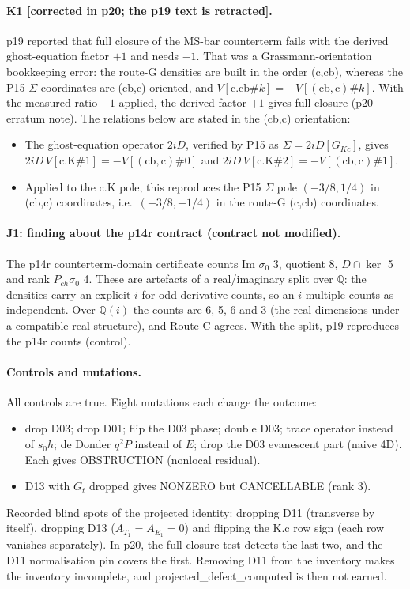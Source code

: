 \paragraph{K1 [corrected in p20; the p19 text is retracted].} p19 reported that full closure of the MS-bar
counterterm fails with the derived ghost-equation factor $+1$ and needs $-1$. That was a Grassmann-orientation
bookkeeping error: the route-G densities are built in the order (c,cb), whereas the P15 $\Sigma$ coordinates are
(cb,c)-oriented, and $V[\mathrm{c.cb}\#k]=-V[(\mathrm{cb,c})\#k]$. With the measured ratio $-1$ applied, the derived
factor $+1$ gives full closure (p20 erratum note). The relations below are stated in the (cb,c) orientation:
\begin{itemize}
\item The ghost-equation operator $2iD$, verified by P15 as $\Sigma=2iD[G_{Kc}]$, gives
  $2iD\,V[\mathrm{c.K\#1}]=-V[(\mathrm{cb,c})\#0]$ and $2iD\,V[\mathrm{c.K\#2}]=-V[(\mathrm{cb,c})\#1]$.
\item Applied to the c.K pole, this reproduces the P15 $\Sigma$ pole $(-3/8,1/4)$ in (cb,c) coordinates, i.e.\
  $(+3/8,-1/4)$ in the route-G (c,cb) coordinates.
\end{itemize}

\paragraph{J1: finding about the p14r contract (contract not modified).} The p14r counterterm-domain certificate
counts Im $\sigma_0$ 3, quotient 8, $D\cap\ker$ 5 and rank $P_{ch}\sigma_0$ 4. These are artefacts of a real/imaginary
split over $\mathbb Q$: the densities carry an explicit $i$ for odd derivative counts, so an $i$-multiple counts as
independent. Over $\mathbb Q(i)$ the counts are 6, 5, 6 and 3 (the real dimensions under a compatible real
structure), and Route C agrees. With the split, p19 reproduces the
p14r counts (control).

\paragraph{Controls and mutations.} All controls are true. Eight mutations each change the outcome:
\begin{itemize}
\item drop D03; drop D01; flip the D03 phase; double D03; trace operator instead of $s_0h$; de Donder $q^2P$ instead
  of $E$; drop the D03 evanescent part (naive 4D). Each gives OBSTRUCTION (nonlocal residual).
\item D13 with $G_t$ dropped gives NONZERO but CANCELLABLE (rank 3).
\end{itemize}
Recorded blind spots of the projected identity: dropping D11 (transverse by itself), dropping D13
($A_{T_1}=A_{E_1}=0$) and flipping the K.c row sign (each row vanishes separately). In p20, the full-closure test
detects the last two, and the D11 normalisation pin covers the first. Removing D11 from the inventory makes the inventory incomplete, and
projected\_defect\_computed is then not earned.


